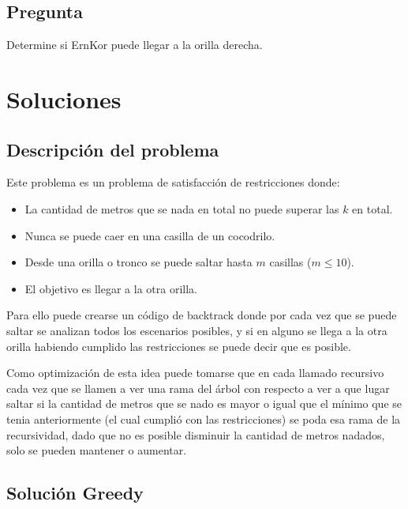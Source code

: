 \documentclass{article}
\begin{document}
\subsection{Pregunta}
Determine si ErnKor puede llegar a la orilla derecha.

\section{Soluciones}

\subsection{Descripción del problema}

Este problema es un problema de satisfacción de restricciones donde:
\begin{itemize}
    \item La cantidad de metros que se nada en total no puede superar las $k$ en total.
    \item Nunca se puede caer en una casilla de un cocodrilo.
    \item Desde una orilla o tronco se puede saltar hasta $m$ casillas ($m \leq 10$).
    \item El objetivo es llegar a la otra orilla.
\end{itemize}

Para ello puede crearse un código de backtrack donde por cada vez que se puede saltar se analizan todos los escenarios posibles, y si en alguno se llega a la otra orilla habiendo cumplido las restricciones se puede decir que es posible.

Como optimización de esta idea puede tomarse que en cada llamado recursivo cada vez que se llamen a ver una rama del árbol con respecto a ver a que lugar saltar si la cantidad de metros que se nado es mayor o igual que el mínimo que se tenia anteriormente (el cual cumplió con las restricciones) se poda esa rama de la recursividad, dado que no es posible disminuir la cantidad de metros nadados, solo se pueden mantener o aumentar.

\subsection{Solución Greedy}
\end{document}
